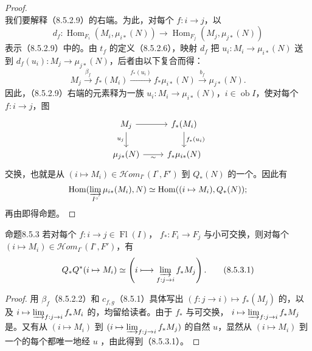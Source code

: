 \begin{proof}
\[\]
我们要解释（8.5.2.9）的右端。为此，对每个 $f:i\to j$，以
\[
 d_f:\operatorname{Hom}_{F_i}(M_i,\mu_{i*}(N))
 \longrightarrow\operatorname{Hom}_{F_j}(M_j,\mu_{j*}(N))
\]
表示（8.5.2.9）中的。由 $t_f$ 的定义（8.5.2.6），映射 $d_f$ 把 $u_i:M_i\to\mu_{i*}(N)$ 送到 $d_f(u_i):M_j\to\mu_{j*}(N)$，后者由以下复合而得：
\[
 M_j\xrightarrow{\beta_f}f_*(M_i)\xrightarrow{f_*(u_i)}f_*\mu_{i*}(N)
 \xrightarrow{b_f}\mu_{j*}(N).
\]
因此，（8.5.2.9）右端的元素释为一族 $u_i:M_i\to\mu_{i*}(N)$，$i\in\operatorname{ob}I$，使对每个 $f:i\to j$，图
\[
\begin{tikzcd}
M_j\arrow[r]\arrow[d,"u_j"']&f_*(M_i)\arrow[d,"f_*(u_i)"]\\
\mu_{j*}(N)\arrow[r,"\sim"']&f_*\mu_{i*}(N)
\end{tikzcd}
\]
交换，也就是从 $(i\mapsto M_i)\in\mathscr{H}\!om_{I^\circ}(I^\circ,F')$ 到 $Q_*(N)$ 的一个。因此有
\[
 \operatorname{Hom}(\varinjlim_{I^\circ}\mu_{i*}(M_i),N)
 \simeq\operatorname{Hom}((i\mapsto M_i),Q_*(N));
\]
再由即得命题。
\end{proof}

\begin{SGAresult}{命题}{8.5.3}
若对每个 $f:i\to j\in\operatorname{Fl}(I)$， $f_*:F_i\to F_j$ 与小可交换，则对每个 $(i\mapsto M_i)\in\mathscr{H}\!om_{I^\circ}(I^\circ,F')$，有
\[
 Q_*Q^*(i\mapsto M_i)\simeq
 \left(i\longmapsto\varinjlim_{f:j\to i}f_*M_j\right).\tag{8.5.3.1}
\]
\end{SGAresult}
\begin{proof}
用 $\beta_f$（8.5.2.2）和 $c_{f,g}$（8.5.1）具体写出 $(f:j\to i)\mapsto f_*(M_j)$ 的，以及 $i\mapsto\varinjlim_{f:j\to i}f_*M_i$ 的，均留给读者。由于 $f_*$ 与可交换， $i\mapsto\varinjlim_{f:j\to i}f_*M_j$ 是。又有从 $(i\mapsto M_i)$ 到 $(i\mapsto\varinjlim_{f:j\to i}f_*M_j)$ 的自然 $u$，显然从 $(i\mapsto M_i)$ 到一个的每个都唯一地经 $u$ ，由此得到（8.5.3.1）。
\end{proof}

